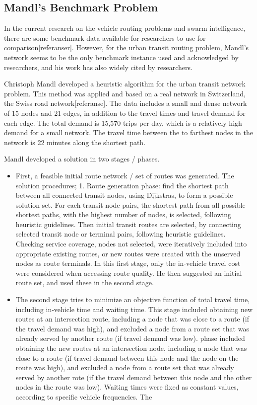 \subsection{Mandl's Benchmark Problem}
In the current research on the vehicle routing problems and swarm intelligence, there are some benchmark data available for researchers to use for comparison[referanser]. However, for the urban transit routing problem, Mandl's network seems to be the only benchmark instance used and acknowledged by researchers, and his work has also widely cited by researchers.  
 
Christoph Mandl developed a heuristic algorithm for the urban transit network problem. This method was applied and based on a real network in Switzerland, the Swiss road network[referanse]. The data includes a small and dense network of 15 nodes and 21 edges, in addition to the travel times and travel demand for each edge. The total demand is 15,570 trips per day, which is a relatively high demand for a small network. The travel time between the to farthest nodes in the network is 22 minutes along the shortest path. 

Mandl developed a solution in two stages / phases. 
\begin{itemize}
\item First, a feasible initial route network / set of routes was generated. The solution procedures; 1. Route generation phase: find the shortest path between all connected transit nodes, using Dijkstras, to form a possible solution set. For each transit node pairs, the shortest path from all possible shortest paths, with the highest number of nodes, is selected, following heuristic guidelines. Then initial transit routes are selected, by connecting selected transit node or terminal pairs, following heuristic guidelines. Checking service coverage, nodes not selected, were iteratively included into appropriate existing routes, or new routes were created with the unserved nodes as route terminals. In this first stage, only the in-vehicle travel cost were considered when accessing route quality. He then suggested an initial route set, and used these in the second stage. 
\item The second stage tries to minimize an objective function of total travel time, including in-vehicle time and waiting time. This stage included obtaining new routes at an intersection route, including a node that was close to a route (if the travel demand was high), and excluded a node from a route set that was already served by another route (if travel demand was low). phase included obtaining the new routes at an intersection node, including a node that was close to a route (if travel demand between this node and the node on the route was high), and excluded a node from a route set that was already served by another rote (if the travel demand between this node and the other nodes in the route was low). Waiting times were fixed as constant values, according to specific vehicle frequencies.  The 
\end{itemize}

